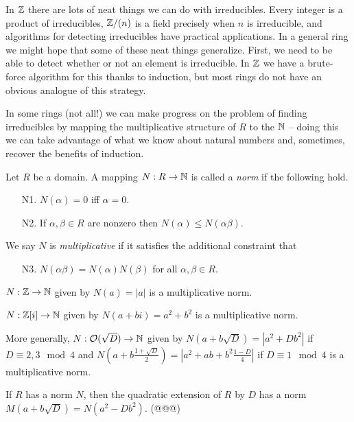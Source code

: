 In \(\mathbb{Z}\) there are lots of neat things we can do with irreducibles.
Every integer is a product of irreducibles, \(\mathbb{Z}/(n)\) is a field precisely when \(n\) is irreducible, and algorithms for detecting irreducibles have practical applications.
In a general ring we might hope that some of these neat things generalize.
First, we need to be able to detect whether or not an element is irreducible.
In \(\mathbb{Z}\) we have a brute-force algorithm for this thanks to induction, but most rings do not have an obvious analogue of this strategy.

In some rings (not all!) we can make progress on the problem of finding irreducibles by mapping the multiplicative structure of \(R\) to the \(\mathbb{N}\) -- doing this we can take advantage of what we know about natural numbers and, sometimes, recover the benefits of induction.

\begin{dfn}[Norm] \label{dfn:norm}
Let \(R\) be a domain.
A mapping \(N : R \rightarrow \mathbb{N}\) is called a \emph{norm} if the following hold.
\begin{itemize}
\item[N1.] \(N(\alpha) = 0\) iff \(\alpha = 0\).
\item[N2.] If \(\alpha,\beta \in R\) are nonzero then \(N(\alpha) \leq N(\alpha\beta)\).
\end{itemize}
We say \(N\) is \emph{multiplicative} if it satisfies the additional constraint that
\begin{itemize}
\item[N3.] \(N(\alpha\beta) = N(\alpha)N(\beta)\) for all \(\alpha, \beta \in R\).
\end{itemize}
\end{dfn}

\begin{examples}
\item \(N : \mathbb{Z} \rightarrow \mathbb{N}\) given by \(N(a) = |a|\) is a multiplicative norm.
\item \(N : \mathbb{Z}[i] \rightarrow \mathbb{N}\) given by \(N(a+bi) = a^2 + b^2\) is a multiplicative norm.
\item More generally, \(N : \mathcal{O}(\sqrt{D}) \rightarrow \mathbb{N}\) given by \(N(a+b\sqrt{D}) = |a^2 + Db^2|\) if \(D \equiv 2,3 \mod 4\) and \(N(a+b\frac{1+\sqrt{D}}{2}) = |a^2 + ab + b^2\frac{1-D}{4}|\) if \(D \equiv 1 \mod 4\) is a multiplicative norm.
\item If \(R\) has a norm \(N\), then the quadratic extension of \(R\) by \(D\) has a norm \(M(a + b\sqrt{D}) = N(a^2 - Db^2)\).
(@@@)
\end{examples}

